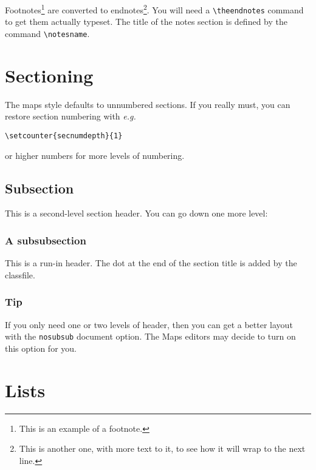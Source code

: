 \documentclass[nosubsub]{maps}
\renewcommand{\notesname}{Footnotes}
\begin{document}
Footnotes\footnote{This is an example of a footnote.}  are converted
to endnotes\footnote{This is another one, with more text to it, to
see how it will wrap to the next line.}. You will need a
\verb+\theendnotes+ command to get them actually typeset. The title
of the notes section is defined by the command \verb+\notesname+.

\section{Sectioning}

The maps style defaults to unnumbered sections. If you really must,
you can restore section numbering with \emph{e.g.}
\begin{verbatim}
\setcounter{secnumdepth}{1}
\end{verbatim}
or higher numbers for more levels of numbering.

\subsection{Subsection}
This is a second-level section header. You can go down one more
level:

\subsubsection{A subsubsection}

This is a run-in header. The dot at the end of the section title is
added by the classfile.

\subsubsection{Tip}
If you only need one or two levels of header, then you can get a
better layout with the \texttt{nosubsub} document option.
The Maps editors may decide to turn on this option for you.

\section{Lists}
\end{document}
